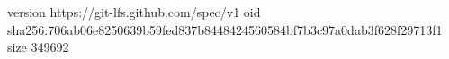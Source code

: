 version https://git-lfs.github.com/spec/v1
oid sha256:706ab06e8250639b59fed837b8448424560584bf7b3c97a0dab3f628f29713f1
size 349692
